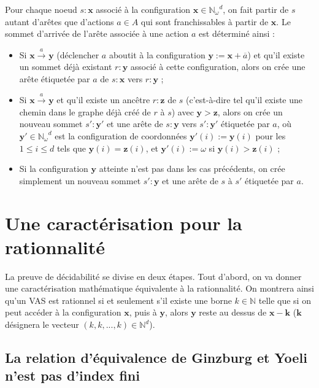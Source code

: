 \documentclass[a4paper,final]{article}
\theoremstyle{definition}
\let\leq\leqslant
\newcommand{\N}{\ensuremath{\mathbb{N}}}
\newcommand{\Nomega}{\ensuremath{\mathbb{N}_\omega}}
\newcommand{\trans}[2]{\ensuremath{\stackrel{#1}{\longrightarrow}_{#2}}}
\newcommand{\vect}[1]{\ensuremath{\mathbf{#1}}}
\newcommand{\valeur}[1]{\ensuremath{\overline{#1}}}
\begin{document}
Pour chaque noeud $s:\vect{x}$ associé à la configuration $\vect{x}\in \Nomega^d$, on fait partir de $s$ autant d'arêtes que d'actions $a\in A$ qui sont franchissables à partir de $\vect{x}$.
Le sommet d'arrivée de l'arête associée à une action $a$ est déterminé ainsi :
\begin{itemize}
    \item Si $\vect{x}\trans{a}{} \vect{y}$ (déclencher $a$ aboutit à la configuration $\vect{y} := \vect{x} + \valeur{a}$) 
    et qu'il existe un sommet déjà existant $r:\vect{y}$ associé à cette configuration, alors on crée une arête étiquetée par $a$ de $s:\vect{x}$ vers $r:\vect{y}$ ;
    \item Si $\vect{x}\trans{a}{} \vect{y}$ et qu'il existe un ancêtre $r:\vect{z}$ de $s$ (c'est-à-dire tel qu'il existe une chemin dans le graphe déjà créé de $r$ à $s$) avec $\vect{y}>\vect{z}$, 
    alors on crée un nouveau sommet $s':\vect{y'}$ et une arête de $s:\vect{y}$ vers $s':\vect{y'}$ étiquetée par $a$, 
    où $\vect{y'}\in \Nomega^d$ est la configuration de coordonnées $\vect{y'}(i):=\vect{y}(i)$ pour les $1\leq i\leq d$ tels que $\vect{y}(i)=\vect{z}(i)$, et $\vect{y'}(i):=\omega$ si $\vect{y}(i)>\vect{z}(i)$ ;
    \item Si la configuration $\vect{y}$ atteinte n'est pas dans les cas précédents, on crée simplement un nouveau sommet $s':\vect{y}$ et une arête de $s$ à $s'$ étiquetée par $a$.
\end{itemize}


\section{Une caractérisation pour la rationnalité}

La preuve de décidabilité se divise en deux étapes.
Tout d'abord, on va donner une caractérisation mathématique équivalente à la rationnalité.
On montrera ainsi qu'un VAS est rationnel si et seulement s'il existe une borne $k\in\N$ telle que si on peut accéder à la configuration $\vect{x}$, puis à $\vect{y}$, alors $\vect{y}$ reste au dessus de $\vect{x}-\vect{k}$
($\vect{k}$ désignera le vecteur $(k,k,...,k)\in\N^d$).

\subsection{La relation d'équivalence de Ginzburg et Yoeli n'est pas d'index fini}
\end{document}
